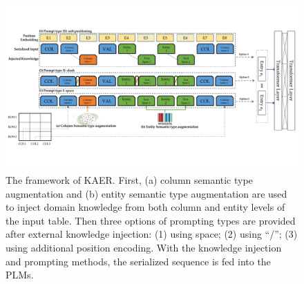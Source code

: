 \begin{figure}[!ht]
    \centering
    \includegraphics[width=\linewidth]{plots/DCER_short.pdf}
    \vspace{-0.8cm}
    \caption{The framework of KAER. First, (a) column semantic type augmentation and (b) entity semantic type augmentation are used to inject domain knowledge from both column and entity levels of the input table. 
    Then three options of prompting types are provided after external knowledge injection: (1) using space; (2) using ``/''; (3) using additional position encoding. 
    With the knowledge injection and prompting methods, the serialized sequence is fed into the PLMs.}
    \vspace{-0.5cm}
    \label{fig:framework}
\end{figure}



